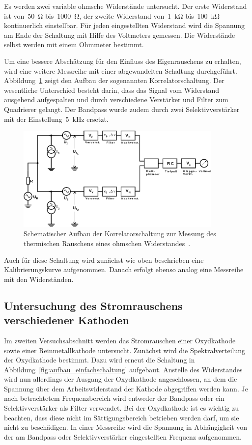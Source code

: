 Es werden zwei variable ohmsche Widerstände untersucht. Der erste Widerstand ist
von~\SI{50}{\ohm} bis~\SI{1000}{\ohm}, der zweite Widerstand
von~\SI{1}{\kilo\ohm} bis~\SI{100}{\kilo\ohm} kontinuerlich einstellbar. Für
jeden eingestellten Widerstand wird die Spannung am Ende der Schaltung mit Hilfe
des Voltmeters gemessen. Die Widerstände selbst werden mit einem Ohmmeter
bestimmt.

Um eine bessere Abschätzung für den Einfluss des Eigenrauschens zu erhalten,
wird eine weitere Messreihe mit einer abgewandelten Schaltung durchgeführt.
Abbildung~\ref{fig:aufbau_korrelatorschaltung} zeigt den Aufbau der sogenannten
Korrelatorschaltung. Der wesentliche Unterschied besteht darin, dass das Signal
vom Widerstand ausgehend aufgespalten und durch verschiedene Verstärker und
Filter zum Quadrierer gelangt. Der Bandpass wurde zudem durch zwei
Selektivverstärker mit der Einstellung~\SI{5}{\kilo\hertz} ersetzt.

\begin{figure}
  \centering
  \includegraphics[width=0.9\textwidth]{figures/aufbau_korrelatorschaltung.pdf}
  \caption{Schematischer Aufbau der Korrelatorschaltung zur Messung des
  thermischen Rauschens eines ohmschen Widerstandes~\cite{V57}.}
  \label{fig:aufbau_korrelatorschaltung}
\end{figure}

Auch für diese Schaltung wird zunächst wie oben beschrieben eine
Kalibrierungskurve aufgenommen. Danach erfolgt ebenso analog eine Messreihe mit
den Widerständen.

\subsection{Untersuchung des Stromrauschens verschiedener Kathoden}

Im zweiten Versuchsabschnitt werden das Stromrauschen einer Oxydkathode sowie
einer Reinmetallkathode untersucht. Zunächst wird die Spektralverteilung der
Oxydkathode bestimmt. Dazu wird erneut die Schaltung in
Abbildung~\ref{fig:aufbau_einfachschaltung} aufgebaut. Anstelle des Widerstandes
wird nun allerdings der Ausgang der Oxydkathode angeschlossen, an dem die
Spannung über dem Arbeitswiderstand der Kathode abgegriffen werden kann. Je nach
betrachtetem Frequenzbereich wird entweder der Bandpass oder ein
Selektivverstärker als Filter verwendet. Bei der Oxydkathode ist es wichtig zu
beachten, dass diese nicht im Sättigungsbereich betrieben werden darf, um sie
nicht zu beschädigen. In einer Messreihe wird die Spannung in Abhängigkeit von
der am Bandpass oder Selektivverstärker eingestellten Frequenz aufgenommen.

